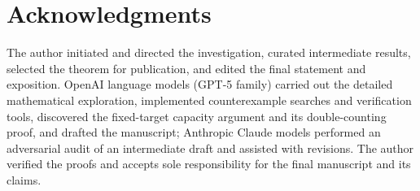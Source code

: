 \documentclass[12pt]{article}
\theoremstyle{plainsl}
\theoremstyle{remark}
\begin{document}
\section*{Acknowledgments}

The author initiated and directed the investigation, curated intermediate
results, selected the theorem for publication, and edited the final statement
and exposition.  OpenAI language models (GPT-5 family) carried out the
detailed mathematical exploration, implemented counterexample searches and
verification tools, discovered the fixed-target capacity argument and its
double-counting proof, and drafted the manuscript; Anthropic Claude models
performed an adversarial audit of an intermediate draft and assisted with
revisions.  The author verified
the proofs and accepts sole responsibility for the final manuscript and its
claims.
\end{document}
